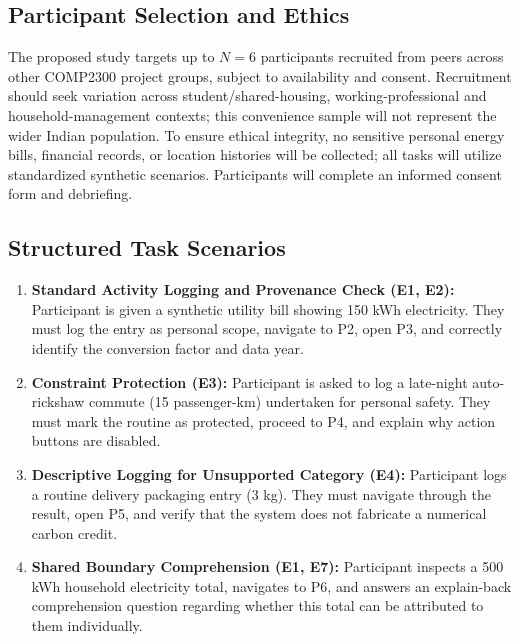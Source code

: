 \documentclass[12pt,a4paper]{article}
\begin{document}
\subsection{Participant Selection and Ethics}
The proposed study targets up to $N=6$ participants recruited from peers across other COMP2300 project groups, subject to availability and consent. Recruitment should seek variation across student/shared-housing, working-professional and household-management contexts; this convenience sample will not represent the wider Indian population. To ensure ethical integrity, no sensitive personal energy bills, financial records, or location histories will be collected; all tasks will utilize standardized synthetic scenarios. Participants will complete an informed consent form and debriefing.

\subsection{Structured Task Scenarios}
\begin{enumerate}[label=\textbf{Task \arabic*:},leftmargin=*]
  \item \textbf{Standard Activity Logging and Provenance Check (E1, E2):} Participant is given a synthetic utility bill showing 150 kWh electricity. They must log the entry as personal scope, navigate to P2, open P3, and correctly identify the conversion factor and data year.
  \item \textbf{Constraint Protection (E3):} Participant is asked to log a late-night auto-rickshaw commute (15 passenger-km) undertaken for personal safety. They must mark the routine as protected, proceed to P4, and explain why action buttons are disabled.
  \item \textbf{Descriptive Logging for Unsupported Category (E4):} Participant logs a routine delivery packaging entry (3 kg). They must navigate through the result, open P5, and verify that the system does not fabricate a numerical carbon credit.
  \item \textbf{Shared Boundary Comprehension (E1, E7):} Participant inspects a 500 kWh household electricity total, navigates to P6, and answers an explain-back comprehension question regarding whether this total can be attributed to them individually.
\end{enumerate}
\end{document}
